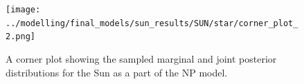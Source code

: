 \documentclass[a4paper,fleqn,usenatbib]{mnras}
\begin{document}
\begin{figure}
    \centering
    \texttt{[image: ../modelling/final\_models/sun\_results/SUN/star/corner\_plot\_2.png]}
    \caption{A corner plot showing the sampled marginal and joint posterior distributions for the Sun as a part of the NP model.}
    \label{fig:sun-results}
\end{figure}



\bsp	%
\label{lastpage}
\end{document}
